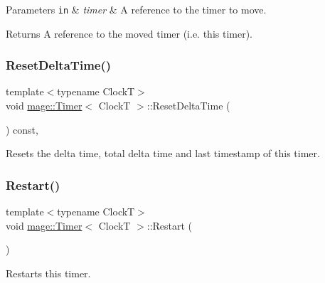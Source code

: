 \begin{DoxyParams}[1]{Parameters}
\mbox{\tt in}  & {\em timer} & A reference to the timer to move. \\
\hline
\end{DoxyParams}
\begin{DoxyReturn}{Returns}
A reference to the moved timer (i.\+e. this timer). 
\end{DoxyReturn}
\hypertarget{classmage_1_1_timer_ac39577316a032bce5b009401d67d406b}{}\label{classmage_1_1_timer_ac39577316a032bce5b009401d67d406b} 
\subsubsection{\texorpdfstring{Reset\+Delta\+Time()}{ResetDeltaTime()}}
{\footnotesize\ttfamily template$<$typename ClockT$>$ \\
void \hyperlink{classmage_1_1_timer}{mage\+::\+Timer}$<$ ClockT $>$\+::Reset\+Delta\+Time (\begin{DoxyParamCaption}{ }\end{DoxyParamCaption}) const\hspace{0.3cm}{\ttfamily [private]}, {\ttfamily [noexcept]}}

Resets the delta time, total delta time and last timestamp of this timer. \hypertarget{classmage_1_1_timer_a54dab2d77f8beca30d52e8497e466988}{}\label{classmage_1_1_timer_a54dab2d77f8beca30d52e8497e466988} 
\subsubsection{\texorpdfstring{Restart()}{Restart()}}
{\footnotesize\ttfamily template$<$typename ClockT$>$ \\
void \hyperlink{classmage_1_1_timer}{mage\+::\+Timer}$<$ ClockT $>$\+::Restart (\begin{DoxyParamCaption}{ }\end{DoxyParamCaption})\hspace{0.3cm}{\ttfamily [noexcept]}}

Restarts this timer. \hypertarget{classmage_1_1_timer_a8464b2ea3fb3d97eac5ccb3a5b02e47b}{}\label{classmage_1_1_timer_a8464b2ea3fb3d97eac5ccb3a5b02e47b} 
